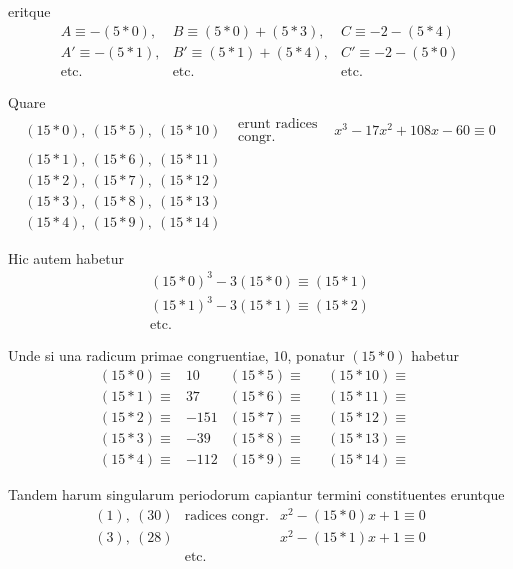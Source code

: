 %
eritque
\[
\begin{array}{lll}
A\equiv-(5\ast0),&B\equiv(5\ast0)+(5\ast3),&C\equiv-2-(5\ast4)\\
A'\equiv-(5\ast1),&B'\equiv(5\ast1)+(5\ast4),&C'\equiv-2-(5\ast0)\\
\text{etc.}&\text{etc.}&\text{etc.}
\end{array}
\]

Quare
\[
\begin{array}{lll}
(15\ast0),\ (15\ast5),\ (15\ast10)&\begin{gathered}\text{erunt radices}\\\text{congr.}\end{gathered}&x^3-17x^2+108x-60\equiv0\\
(15\ast1),\ (15\ast6),\ (15\ast11)&&\\
(15\ast2),\ (15\ast7),\ (15\ast12)&&\\
(15\ast3),\ (15\ast8),\ (15\ast13)&&\\
(15\ast4),\ (15\ast9),\ (15\ast14)&&
\end{array}
\]

Hic autem habetur
\[
\begin{gathered}
(15\ast0)^3-3(15\ast0)\equiv(15\ast1)\\
(15\ast1)^3-3(15\ast1)\equiv(15\ast2)\\
\text{etc.}
\end{gathered}
\]

Unde si una radicum primae congruentiae, $10$, ponatur $(15\ast0)$ habetur
\[
\begin{array}{rlrlrl}
(15\ast0)\equiv&10&(15\ast5)\equiv&& (15\ast10)\equiv&\\
(15\ast1)\equiv&37&(15\ast6)\equiv&& (15\ast11)\equiv&\\
(15\ast2)\equiv&-151&(15\ast7)\equiv&& (15\ast12)\equiv&\\
(15\ast3)\equiv&-39&(15\ast8)\equiv&& (15\ast13)\equiv&\\
(15\ast4)\equiv&-112&(15\ast9)\equiv&& (15\ast14)\equiv&
\end{array}
\]

Tandem harum singularum periodorum capiantur termini constituentes eruntque
\[
\begin{array}{lll}
(1),\ (30)&\text{radices congr.}&x^2-(15\ast0)x+1\equiv0\\
(3),\ (28)&&x^2-(15\ast1)x+1\equiv0\\
&\text{etc.}
\end{array}
\]

